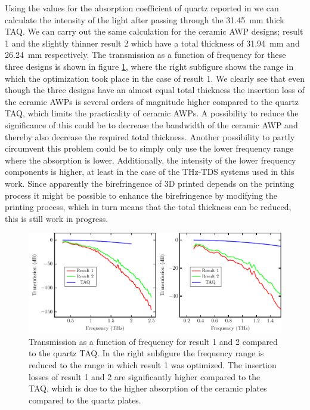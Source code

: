 Using the values for the absorption coefficient of quartz reported in \cite{DGrischkowsky1990} we can calculate the intensity of the light after passing through the \SI{31.45}{\milli \meter} thick TAQ. We can carry out the same calculation for the ceramic AWP designs; result 1 and the slightly thinner result 2 which have a total thickness of \SI{31.94}{\milli \meter} and \SI{26.24}{\milli \meter} respectively. The transmission as a function of frequency for these three designs is shown in figure \ref{fig:cl4_intensity}, where the right subfigure shows the range in which the optimization took place in the case of result 1. We clearly see that even though the three designs have an almost equal total thickness the insertion loss of the ceramic AWPs is several orders of magnitude higher compared to the quartz TAQ, which limits the practicality of ceramic AWPs.
A possibility to reduce the significance of this could be to decrease the bandwidth of the ceramic AWP and thereby also decrease the required total thickness. Another possibility to partly circumvent this problem could be to simply only use the lower frequency range where the absorption is lower. Additionally, the intensity of the lower frequency components is higher, at least in the case of the THz-TDS systems used in this work. Since apparently the birefringence of 3D printed  depends on the printing process it might be possible to enhance the birefringence by modifying the printing process, which in turn means that the total thickness can be reduced, this is still work in progress.

\begin{figure}[ht]
    \centering
    \includegraphics[scale=0.75]{images/results/plots/ceramic/intensity.pdf}
    \caption{Transmission as a function of frequency for result 1 and 2 compared to the quartz TAQ. In the right subfigure the frequency range is reduced to the range in which result 1 was optimized. The insertion losses of result 1 and 2 are significantly higher compared to the TAQ, which is due to the higher absorption of the ceramic plates compared to the quartz plates.}
    \label{fig:cl4_intensity}
\end{figure}

